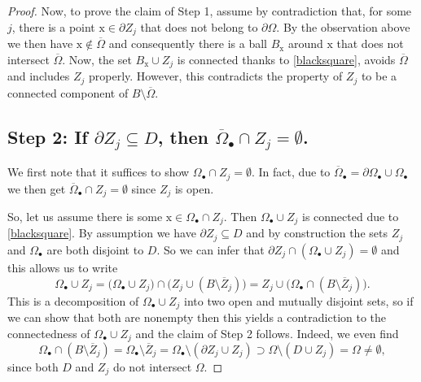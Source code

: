 \documentclass[10pt,leqno]{amsart}
\theoremstyle{definition}
\numberwithin{equation}{section}
\begin{document}
\begin{proof}
 Now, to prove the claim of Step 1, assume by contradiction that, for some $j$,
 there is a point ${{\mathrm x}} \in \partial Z_j$ that does not belong to
 $\partial \Omega$. By the observation above we then have ${{\mathrm x}} \notin
 \overline \Omega$ and consequently there is a ball $B_{{\mathrm x}}$ around
 ${{\mathrm x}}$ that does not intersect $\overline \Omega$. Now, the set
 $B_{{\mathrm x}} \cup Z_j$ is connected thanks to \eqref{blacksquare}, avoids
 $\overline \Omega$ and includes $Z_j$ properly. However, this contradicts the
 property of $Z_j$ to be a connected component of $B \setminus \overline
 \Omega$.

\subsection*{Step 2: If $\partial Z_j \subseteq D$, then
 $\overline{\Omega}_\bullet \cap Z_j = \emptyset$.}
 We first note that it suffices to show $\Omega_\bullet \cap Z_j = \emptyset$.
 In fact, due to $\overline \Omega_\bullet = \partial \Omega_\bullet \cup
 \Omega_\bullet$ we then get $\overline{\Omega}_\bullet \cap Z_j =
 \emptyset$ since $Z_j$ is open.

 So, let us assume there is some ${{\mathrm x}} \in \Omega_\bullet \cap Z_j$. Then
 $\Omega_\bullet \cup Z_j$ is connected due to \eqref{blacksquare}. By
 assumption we have $\partial Z_j \subseteq D$ and by construction the sets
 $Z_j$ and $\Omega_\bullet$ are both disjoint to $D$. So we can infer that
 $\partial Z_j \cap (\Omega_\bullet \cup Z_j) = \emptyset$ and this allows us
 to write
 \[ \Omega_\bullet \cup Z_j = \bigl( \Omega_\bullet \cup Z_j \bigr) \cap \bigl(
	Z_j \cup ( B \setminus \overline Z_j ) \bigr) = Z_j \cup
	\bigl( \Omega_\bullet \cap ( B \setminus \overline Z_j ) \bigr).
 \]
 This is a decomposition of $\Omega_\bullet \cup Z_j$ into two open and
 mutually disjoint sets, so if we can show that both are nonempty then this
 yields a contradiction to the connectedness of $\Omega_\bullet \cup Z_j$ and
 the claim of Step 2 follows. Indeed, we even find
 \[ \Omega_\bullet \cap ( B \setminus \overline Z_j ) = \Omega_\bullet
	\setminus \overline Z_j = \Omega_\bullet \setminus (\partial Z_j \cup
	Z_j) \supset \Omega \setminus (D \cup Z_j) = \Omega \neq \emptyset,
 \]
 since both $D$ and $Z_j$ do not intersect $\Omega$.


\end{proof}
\end{document}
